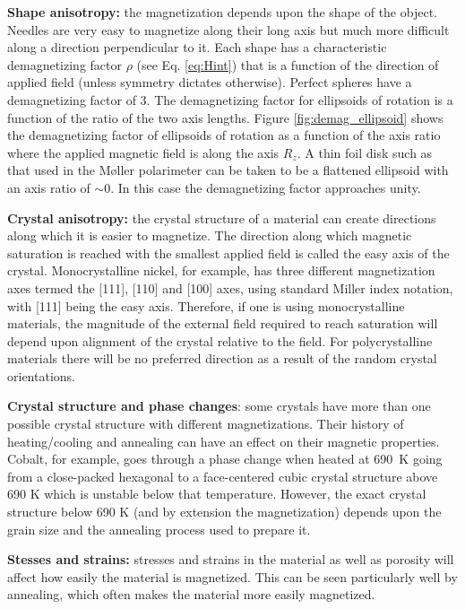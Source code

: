 \documentclass[preprint,12pt]{elsarticle}
\begin{document}
{\bf Shape anisotropy:} the magnetization depends upon the shape of the object. Needles are very easy to magnetize along their long axis but much more difficult along a direction perpendicular to it. Each shape has a characteristic demagnetizing factor $\rho$ (see Eq. \ref{eq:Hint}) that is a function of the direction of applied field (unless symmetry dictates otherwise). Perfect spheres have a demagnetizing factor of 3. The demagnetizing factor for ellipsoids of rotation is a function of the ratio of the two axis lengths. Figure \ref{fig:demag_ellipsoid} shows the demagnetizing factor of ellipsoids of rotation as a function of the axis ratio where the applied magnetic field is along the axis $R_z$. A thin foil disk such as that used in the M\o ller polarimeter can be taken to be a flattened ellipsoid with an axis ratio of $\sim$0. In this case the demagnetizing factor approaches unity\cite{Skomski2007}.

{\bf Crystal anisotropy:} the crystal structure of a material can create directions along which it is easier to magnetize. The direction along which magnetic saturation is reached with the smallest applied field is called the easy axis of the crystal. Monocrystalline nickel, for example, has three different magnetization axes termed the [111], [110] and [100] axes, using standard Miller index notation, with [111] being the easy axis. Therefore, if one is using monocrystalline materials, the magnitude of the external field required to reach saturation will depend upon alignment of the crystal relative to the field. For polycrystalline materials there will be no preferred direction as a result of the random crystal orientations.

{\bf Crystal structure and phase changes}: some crystals have more than one possible crystal structure with different magnetizations. Their history of heating/cooling and annealing can have an effect on their magnetic properties. Cobalt, for example, goes through a phase change when heated at 690~K going from a close-packed hexagonal to a face-centered cubic crystal structure above 690 K which is unstable below that temperature. However, the exact crystal structure below 690 K (and by extension the magnetization) depends upon the grain size and the annealing process used to prepare it\cite{Owen1954}.

{\bf Stesses and strains:} stresses and strains in the material as well as porosity will affect how easily the material is magnetized. This can be seen particularly well by annealing, which often makes the material more easily magnetized\cite{Case1966}.
\end{document}
